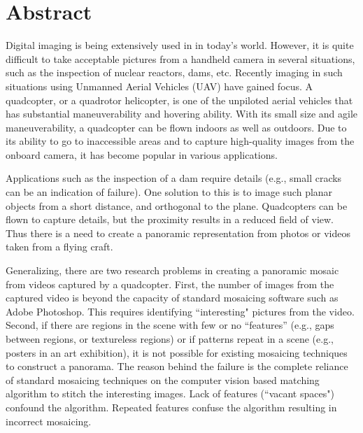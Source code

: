 \chapter*{Abstract}
\thispagestyle{empty}
Digital imaging is being extensively used in 
in today's world. However, it is quite difficult to take acceptable pictures from a handheld
camera in several situations, such as the inspection of nuclear reactors, dams, etc. Recently
imaging in such situations using Unmanned Aerial Vehicles (UAV) have gained focus. A
quadcopter, or a quadrotor helicopter, is one of the unpiloted aerial vehicles
that has substantial maneuverability and hovering ability. With its small size and
agile maneuverability, a quadcopter can be flown indoors as well as
outdoors. Due to its ability to go to inaccessible areas 
and to capture high-quality images from the
onboard camera, it has become popular in various applications.

Applications such as the inspection of a dam require details (e.g., small cracks can be an indication of failure).
One solution to this is to image such planar objects from a short distance, and orthogonal to the plane. Quadcopters can be flown to capture details, but the proximity results in a reduced field of view. Thus there is a need to create a panoramic representation from photos or videos taken from a flying craft.

Generalizing, there are two research problems in creating a panoramic mosaic from videos captured by a quadcopter. First,
the number of images from the captured video is beyond the capacity of standard
mosaicing software such as Adobe Photoshop. This requires identifying ``interesting" pictures from the video. Second, if there are regions in the scene with few 
or no ``features'' (e.g., gaps between regions, or textureless regions) or if patterns
repeat in a scene (e.g., posters in an art exhibition), it is not possible for existing
mosaicing techniques to construct a panorama. The reason behind 
the failure is the complete reliance of standard mosaicing techniques on the computer vision based matching
algorithm to stitch the interesting images. Lack of features (``vacant spaces") confound the algorithm.  Repeated features confuse the algorithm resulting in incorrect mosaicing.

